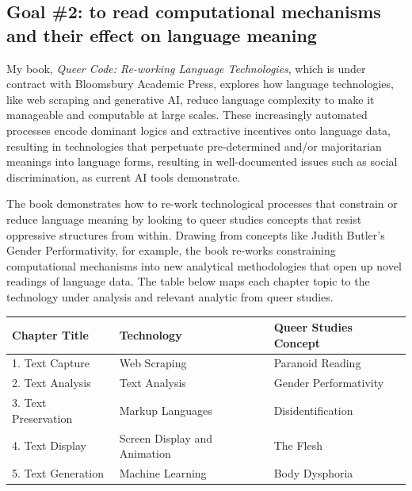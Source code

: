 \documentclass[12pt]{article}
\begin{document}
\subsection*{Goal \#2: to read computational mechanisms and their effect on language meaning}
\label{sec:org766a7a4}

My book, \emph{Queer Code: Re-working Language Technologies}, which is
under contract with Bloomsbury Academic Press, explores how language
technologies, like web scraping and generative AI, reduce language
complexity to make it manageable and computable at large scales. These
increasingly automated processes encode dominant logics and extractive
incentives onto language data, resulting in technologies that
perpetuate pre-determined and/or majoritarian meanings into language
forms, resulting in well-documented issues such as social
discrimination, as current AI tools demonstrate.

The book demonstrates how to re-work technological processes that
constrain or reduce language meaning by looking to queer studies
concepts that resist oppressive structures from within. Drawing from
concepts like Judith Butler's Gender Performativity, for example, the
book re-works constraining computational mechanisms into new
analytical methodologies that open up novel readings of language data.
The table below maps each chapter topic to the technology under
analysis and relevant analytic from queer studies.

\begin{center}
\begin{tabular}{lll}
Chapter Title & Technology & Queer Studies Concept\\[0pt]
\hline
1. Text Capture & Web Scraping & Paranoid Reading\footnotemark\\[0pt]
2. Text Analysis & Text Analysis & Gender Performativity\footnotemark\\[0pt]
3. Text Preservation & Markup Languages & Disidentification\footnotemark\\[0pt]
4. Text Display & Screen Display and Animation & The Flesh\footnotemark\\[0pt]
5. Text Generation & Machine Learning & Body Dysphoria\footnotemark\\[0pt]
\end{tabular}
\end{center}
\end{document}
